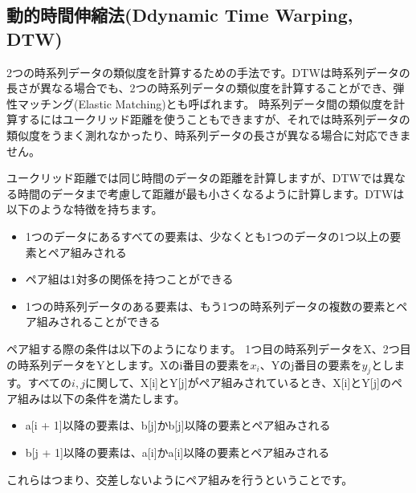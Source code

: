 \documentclass{jlreq}
\begin{document}
\subsection{動的時間伸縮法(Ddynamic Time Warping, DTW)}
2つの時系列データの類似度を計算するための手法です。DTWは時系列データの長さが異なる場合でも、2つの時系列データの類似度を計算することができ、弾性マッチング(Elastic Matching)とも呼ばれます。
時系列データ間の類似度を計算するにはユークリッド距離を使うこともできますが、それでは時系列データの類似度をうまく測れなかったり、時系列データの長さが異なる場合に対応できません。

\begin{center}
\end{center}

\vspace{0.5cm}

ユークリッド距離では同じ時間のデータの距離を計算しますが、DTWでは異なる時間のデータまで考慮して距離が最も小さくなるように計算します。DTWは以下のような特徴を持ちます。

\begin{itemize}
  \item 1つのデータにあるすべての要素は、少なくとも1つのデータの1つ以上の要素とペア組みされる
  \item ペア組は1対多の関係を持つことができる
  \item 1つの時系列データのある要素は、もう1つの時系列データの複数の要素とペア組みされることができる
\end{itemize}

ペア組する際の条件は以下のようになります。
1つ目の時系列データをX、2つ目の時系列データをYとします。Xのi番目の要素を$x_i$、Yのj番目の要素を$y_j$とします。すべての$i, j$に関して、X[i]とY[j]がペア組みされているとき、X[i]とY[j]のペア組みは以下の条件を満たします。
\begin{itemize}
  \item a[i + 1]以降の要素は、b[j]かb[j]以降の要素とペア組みされる
  \item b[j + 1]以降の要素は、a[i]かa[i]以降の要素とペア組みされる
\end{itemize}

これらはつまり、交差しないようにペア組みを行うということです。
\end{document}

